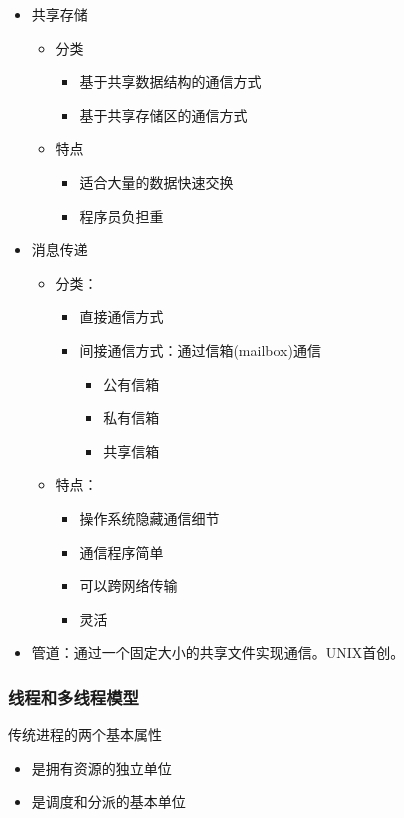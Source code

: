 \documentclass[12pt, a4paper, oneside]{ctexart}
\begin{document}
\begin{itemize}
  \item 共享存储
  \begin{itemize}
    \item 分类
    \begin{itemize}
        \item 基于共享数据结构的通信方式
        \item 基于共享存储区的通信方式
    \end{itemize}
    \item 特点
    \begin{itemize}
        \item 适合大量的数据快速交换
        \item 程序员负担重
    \end{itemize}
  \end{itemize}
  \item 消息传递
  \begin{itemize}
    \item 分类：
    \begin{itemize}
        \item 直接通信方式
        \item 间接通信方式：通过信箱(mailbox)通信
        \begin{itemize}
            \item 公有信箱
            \item 私有信箱
            \item 共享信箱
        \end{itemize}
    \end{itemize}
    \item 特点：
    \begin{itemize}
        \item 操作系统隐藏通信细节
        \item 通信程序简单
        \item 可以跨网络传输
        \item 灵活
    \end{itemize}
  \end{itemize}
  \item 管道：通过一个固定大小的共享文件实现通信。UNIX首创。
\end{itemize}

\subsubsection{线程和多线程模型}

传统进程的两个基本属性
\begin{itemize}
    \item 是拥有资源的独立单位
    \item 是调度和分派的基本单位
\end{itemize}
\end{document}
